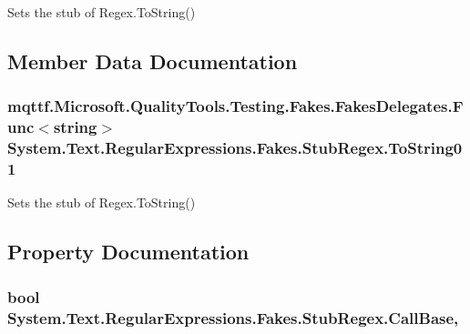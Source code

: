 Sets the stub of Regex.\-To\-String()



\subsection{Member Data Documentation}
\hypertarget{class_system_1_1_text_1_1_regular_expressions_1_1_fakes_1_1_stub_regex_a5bd5632b5176ba46c5579d0dc9d4bb1f}{
\subsubsection[{To\-String01}]{\setlength{\rightskip}{0pt plus 5cm}mqttf.\-Microsoft.\-Quality\-Tools.\-Testing.\-Fakes.\-Fakes\-Delegates.\-Func$<$string$>$ System.\-Text.\-Regular\-Expressions.\-Fakes.\-Stub\-Regex.\-To\-String01}}\label{class_system_1_1_text_1_1_regular_expressions_1_1_fakes_1_1_stub_regex_a5bd5632b5176ba46c5579d0dc9d4bb1f}


Sets the stub of Regex.\-To\-String()



\subsection{Property Documentation}
\hypertarget{class_system_1_1_text_1_1_regular_expressions_1_1_fakes_1_1_stub_regex_aa3999a3ad473f15a1e2f1d29d777215a}{
\subsubsection[{Call\-Base}]{\setlength{\rightskip}{0pt plus 5cm}bool System.\-Text.\-Regular\-Expressions.\-Fakes.\-Stub\-Regex.\-Call\-Base\hspace{0.3cm}{\ttfamily [get]}, {\ttfamily [set]}}}\label{class_system_1_1_text_1_1_regular_expressions_1_1_fakes_1_1_stub_regex_aa3999a3ad473f15a1e2f1d29d777215a}


